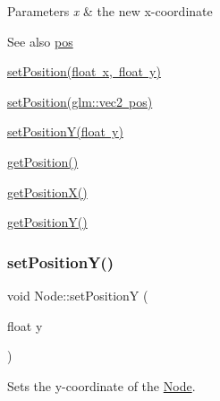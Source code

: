 \begin{DoxyParams}{Parameters}
{\em x} & the new x-\/coordinate \\
\hline
\end{DoxyParams}
\begin{DoxySeeAlso}{See also}
\mbox{\hyperlink{classsage_1_1Node_a7e0ae6eeb84fae60e54e6685c982b0b2}{pos}} 

\mbox{\hyperlink{classsage_1_1Node_aaa8545c103ef1b35e5076dbedab93af5}{set\+Position(float x, float y)}} 

\mbox{\hyperlink{classsage_1_1Node_ae2731cefe38e706c2bf21afae6da18b3}{set\+Position(glm\+::vec2 pos)}} 

\mbox{\hyperlink{classsage_1_1Node_a5c97d36655f0daa71a5f6c715d2b0470}{set\+Position\+Y(float y)}} 

\mbox{\hyperlink{classsage_1_1Node_a67eb5862f4da3cc4b2219a7e555a5678}{get\+Position()}} 

\mbox{\hyperlink{classsage_1_1Node_a17e92da5beaeb4b299c4e93729a22b1a}{get\+Position\+X()}} 

\mbox{\hyperlink{classsage_1_1Node_a26337a40b7da400233451b71e85759cc}{get\+Position\+Y()}} 
\end{DoxySeeAlso}
\mbox{\label{classsage_1_1Node_a5c97d36655f0daa71a5f6c715d2b0470}} 
\subsubsection{\texorpdfstring{setPositionY()}{setPositionY()}}
{\footnotesize\ttfamily void Node\+::set\+PositionY (\begin{DoxyParamCaption}\item[{float}]{y }\end{DoxyParamCaption})}



Sets the y-\/coordinate of the \mbox{\hyperlink{classsage_1_1Node}{Node}}. 


